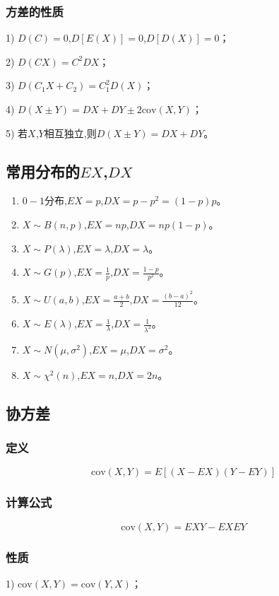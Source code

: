 \documentclass[UTF8]{ctexart}
\theoremstyle{remark}
\begin{document}
		\subsubsection{方差的性质}
		1) \(D(C)=0\),\(D[E(X)] = 0\),\(D[D(X)] = 0\)；
		
		2) \(D(CX)=C^{2}DX\)；
		
		3) \(D(C_1X + C_2)=C_1^{2}D(X)\)；
		
		4) \(D(X\pm Y)=DX + DY\pm 2\mathrm{cov}(X,Y)\)；
		
		5) 若\(X\),\(Y\)相互独立,则\(D(X\pm Y)=DX + DY\)。
		
		\subsection{常用分布的\(EX\),\(DX\)}
		\begin{enumerate}
			\item \(0 - 1\)分布,\(EX = p\),\(DX = p - p^{2}=(1 - p)p\)。
			\item \(X\sim B(n,p)\),\(EX = np\),\(DX = np(1 - p)\)。
			\item \(X\sim P(\lambda)\),\(EX = \lambda\),\(DX = \lambda\)。
			\item \(X\sim G(p)\),\(EX = \frac{1}{p}\),\(DX = \frac{1 - p}{p^{2}}\)。
			\item \(X\sim U(a,b)\),\(EX = \frac{a + b}{2}\),\(DX = \frac{(b - a)^{2}}{12}\)。
			\item \(X\sim E(\lambda)\),\(EX = \frac{1}{\lambda}\),\(DX = \frac{1}{\lambda^{2}}\)。
			\item \(X\sim N(\mu,\sigma^{2})\),\(EX = \mu\),\(DX = \sigma^{2}\)。
			\item \(X\sim \chi^{2}(n)\),\(EX = n\),\(DX = 2n\)。
		\end{enumerate}
		
		\subsection{协方差}
		\subsubsection{定义}
		\[
		\mathrm{cov}(X,Y)=E[(X - EX)(Y - EY)]
		\]
		\subsubsection{计算公式}
		\[
		\mathrm{cov}(X,Y)=EXY - EXEY
		\]
		\subsubsection{性质}
		1) \(\mathrm{cov}(X,Y)=\mathrm{cov}(Y,X)\)；
		
\end{document}

